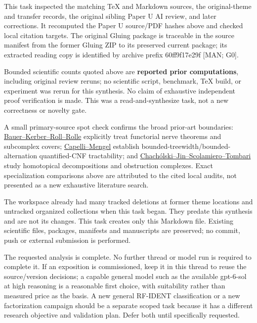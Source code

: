 \documentclass[10pt,letterpaper]{article}
\begin{document}
This task inspected the matching TeX and Markdown sources, the original-theme and transfer records, the original sibling Paper U AI review, and later corrections. It recomputed the Paper U source/PDF hashes above and checked local citation targets. The original Gluing package is traceable in the source manifest from the former Gluing ZIP to its preserved current package; its extracted reading copy is identified by archive prefix 60ff9f17e29f [MAN; G0].\par

Bounded scientific counts quoted above are \textbf{reported prior computations}, including original review reruns; no scientific script, benchmark, TeX build, or experiment was rerun for this synthesis. No claim of exhaustive independent proof verification is made. This was a read-and-synthesize task, not a new correctness or novelty gate.\par

A small primary-source spot check confirms the broad prior-art boundaries: \href{\detokenize{https://arxiv.org/abs/2203.03571}}{Bauer--Kerber--Roll--Rolle} explicitly treat functorial nerve theorems and subcomplex covers; \href{\detokenize{https://arxiv.org/abs/1807.04263}}{Capelli--Mengel} establish bounded-treewidth/bounded-alternation quantified-CNF tractability; and \href{\detokenize{https://link.springer.com/article/10.1007/s41468-021-00066-2}}{Chach\'{o}lski--Jin--Scolamiero--Tombari} study homotopical decompositions and obstruction complexes. Exact specialization comparisons above are attributed to the cited local audits, not presented as a new exhaustive literature search.\par

The workspace already had many tracked deletions at former theme locations and untracked organized collections when this task began. They predate this synthesis and are not its changes. This task creates only this Markdown file. Existing scientific files, packages, manifests and manuscripts are preserved; no commit, push or external submission is performed.\par

The requested analysis is complete. No further thread or model run is required to complete it. If an exposition is commissioned, keep it in this thread to reuse the source/version decisions; a capable general model such as the available gpt-6-sol at high reasoning is a reasonable first choice, with suitability rather than measured price as the basis. A new general RF-IDENT classification or a new factorization campaign should be a separate scoped task because it has a different research objective and validation plan. Defer both until specifically requested.\par
\end{document}
